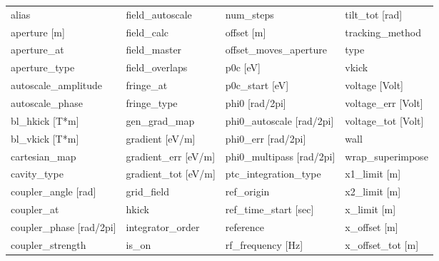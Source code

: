 \begin{tabular}{llll} \toprule
alias                            & field_autoscale                  & num_steps                        & tilt_tot [rad]                   \\
aperture [m]                     & field_calc                       & offset [m]                       & tracking_method                  \\
aperture_at                      & field_master                     & offset_moves_aperture            & type                             \\
aperture_type                    & field_overlaps                   & p0c [eV]                         & vkick                            \\
autoscale_amplitude              & fringe_at                        & p0c_start [eV]                   & voltage [Volt]                   \\
autoscale_phase                  & fringe_type                      & phi0 [rad/2pi]                   & voltage_err [Volt]               \\
bl_hkick [T*m]                   & gen_grad_map                     & phi0_autoscale [rad/2pi]         & voltage_tot [Volt]               \\
bl_vkick [T*m]                   & gradient [eV/m]                  & phi0_err [rad/2pi]               & wall                             \\
cartesian_map                    & gradient_err [eV/m]              & phi0_multipass [rad/2pi]         & wrap_superimpose                 \\
cavity_type                      & gradient_tot [eV/m]              & ptc_integration_type             & x1_limit [m]                     \\
coupler_angle [rad]              & grid_field                       & ref_origin                       & x2_limit [m]                     \\
coupler_at                       & hkick                            & ref_time_start [sec]             & x_limit [m]                      \\
coupler_phase [rad/2pi]          & integrator_order                 & reference                        & x_offset [m]                     \\
coupler_strength                 & is_on                            & rf_frequency [Hz]                & x_offset_tot [m]                 \\

\end{tabular}
